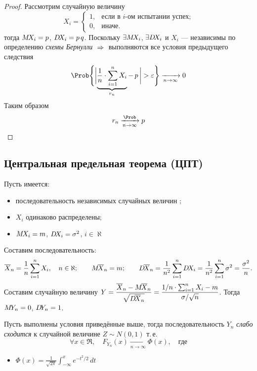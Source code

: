 \begin{proof}
	Рассмотрим случайную величину
	\[
		X_i = \begin{cases*}
		1, & \text{если в $i$-ом испытании успех;} \\
		0, & \text{иначе.}
		\end{cases*}
	\]
	тогда $M\!X_i = p$, $D\!X_i = p\,q$. Поскольку $\exists M\!X_i$, $\exists D\!X_i$ и $X_i$ --- независимы по определению \emph{схемы Бернулли} $\;\Rightarrow\;$ выполняются все условия предыдущего следствия
	\[
		\Prob\Biggl\{ \biggl| \underbrace{\frac{1}{n} \cdot \sum_{i = 1}^{n} X_i}_{r_n} -\, p\, \biggr| > \varepsilon \Biggr\} \xrightarrow[n\to\infty]{} 0
	\]
	Таким образом
	\[
		r_n \xrightarrow[n\to\infty]{\Prob} p
	\]
\end{proof}


\subsection{Центральная предельная теорема (ЦПТ)}

Пусть имеется:
\begin{itemize}
	\item последовательность независимых случайных величин \infseqX;
	\item $X_i$ одинаково распределены;
	\item $M\!X_i = m$, $D\!X_i = \sigma^2$, $i \in \aleph$
\end{itemize}
Составим последовательность: 
\begin{align*}
	\overline{X}_n = \frac{1}{n}\sum_{i = 1}^{n} X_i, \quad n \in \aleph; \qquad M\!\overline{X}_n = m; \qquad D\!\overline{X}_n = \frac{1}{n^2}\sum_{i = 1}^{n} D\!X_i = \frac{1}{n^2}\sum_{i = 1}^{n} \sigma^2 = \frac{\sigma^2}{n}.
\end{align*}
Составим случайную величину $\displaystyle Y = \frac{\overline{X}_n - M\!\overline{X}_n}{\sqrt{D\!\overline{X}_n}} = \frac{1/n \cdot \sum_{i = 1}^{n} X_i - m}{\sigma/\sqrt{n}}$. Тогда $M\!Y_n = 0$, $D\!Y_n = 1$.

\begin{thm}
	Пусть выполнены условия приведённые выше, тогда последовательность $Y_n$ \emph{слабо сходится} к случайной величине $Z \sim N(0, 1)$ т.\,е.
	\[
		\forall x \in \Re, \quad F_{Y_n}(x) \xrightarrow[n\to\infty]{} \Phi(x), \quad \text{где}
	\]
	\begin{itemize}
		\item $\displaystyle \Phi(x) = \frac{1}{\sqrt{2\pi}} \int_{-\infty}^{x}e^{- t^2/2}\, dt$
	\end{itemize}
\end{thm}

